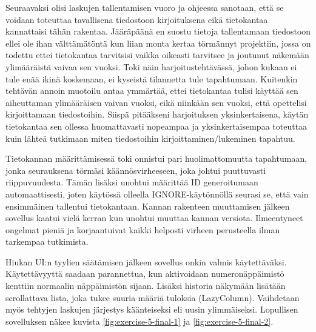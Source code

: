 Seuraavaksi olisi laskujen tallentamisen vuoro ja ohjeessa sanotaan, että se
voidaan toteuttaa tavallisena tiedostoon kirjoituksena eikä tietokantaa
kannattaisi tähän rakentaa. Jääräpäänä en suostu tietoja tallentamaan
tiedostoon ellei ole ihan välttämätöntä kun liian monta kertaa törmännyt
projektiin, jossa on todettu ettei tietokantaa tarvitsisi vaikka oikeasti
tarvitsee ja joutunut näkemään ylimääräistä vaivaa sen vuoksi. Toki näin
harjoitustehtävässä, johon kukaan ei tule enää ikinä koskemaan, ei kyseistä
tilannetta tule tapahtumaan. Kuitenkin tehtävän annoin muotoilu antaa ymmärtää,
ettei tietokantaa tulisi käyttää sen aiheuttaman ylimääräisen vaivan vuoksi,
eikä niinkään sen vuoksi, että opettelisi kirjoittamaan tiedostoihin. Siispä
pitääkseni harjoituksen yksinkertaisena, käytän tietokantaa sen ollessa
huomattavasti nopeampaa ja yksinkertaisempaa toteuttaa kuin lähteä tutkimaan
miten tiedostoihin kirjoittaminen/lukeminen tapahtuu.

Tietokannan määrittämisessä toki onnistui pari huolimattomuutta tapahtumaan,
jonka seurauksena törmäsi käännösvirheeseen, joka johtui puuttuvasti
riippuvuudesta. Tämän lisäksi unohtui määrittää ID generoitumaan
automaattisesti, joten käytössä olleella IGNORE-käytönnöllä seurasi se, että
vain ensimmäinen tallentui tietokantaan. Kannan rakenteen muuttamisen jälkeen
sovellus kaatui vielä kerran kun unohtui muuttaa kannan versiota. Ilmeentyneet
ongelmat pieniä ja korjaantuivat kaikki helposti virheen perusteella ilman
tarkempaa tutkimista.

Hiukan UI:n tyylien säätämisen jälkeen sovellus onkin valmis käytettäväksi.
Käytettävyyttä saadaan parannettua, kun aktivoidaan numeronäppäimistö kenttiin
normaalin näppäimistön sijaan. Lisäksi historia näkymään lisätään scrollattava
lista, joka tukee suuria määriä tuloksia (LazyColumn). Vaihdetaan myös tehtyjen
laskujen järjestys käänteiseksi eli uusin ylimmäiseksi. Lopullisen sovelluksen
näkee kuvista \ref{fig:exercise-5-final-1} ja \ref{fig:exercise-5-final-2}.

